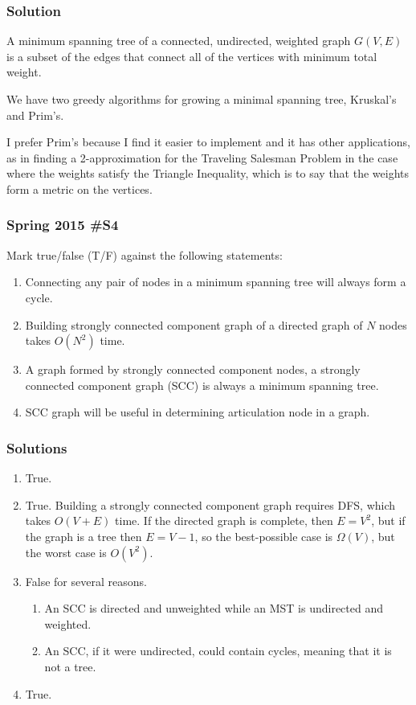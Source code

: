 \subsubsection{Solution}

A minimum spanning tree of a connected, undirected, weighted graph $G(V,E)$ is a subset of the edges that connect all of the vertices with minimum total weight.  

We have two greedy algorithms for growing a minimal spanning tree, Kruskal's and Prim's.  

I prefer Prim's because I find it easier to implement and it has other applications, as in finding a 2-approximation for the Traveling Salesman Problem in the case where the weights satisfy the Triangle Inequality, which is to say that the weights form a metric on the vertices.  

\subsubsection{Spring 2015 \#S4}
Mark true/false (T/F) against the following statements:
	\begin{enumerate}
		\item Connecting any pair of nodes in a minimum spanning tree will always form a cycle.
		\item Building strongly connected component graph of a directed graph of $N$ nodes takes $O(N^2)$ time.  
		\item A graph formed by strongly connected component nodes, a strongly connected component graph (SCC) is always a minimum spanning tree.
		\item SCC graph will be useful in determining articulation node in a graph.
	\end{enumerate}
	
\subsubsection{Solutions}

\begin{enumerate}
	\item True.
	\item True.  Building a strongly connected component graph requires DFS, which takes $O(V+E)$ time.  If the directed graph is complete, then $E = V^2$, but if the graph is a tree then $E = V-1$, so the best-possible case is $\Omega(V)$, but the worst case is $O(V^2)$.  
	\item False for several reasons.  
	\begin{enumerate}[label=\alph*.]
		\item An SCC is directed and unweighted while an MST is undirected and weighted.
		\item An SCC, if it were undirected, could contain cycles, meaning that it is not a tree.
	\end{enumerate}
	\item True.  
\end{enumerate}

